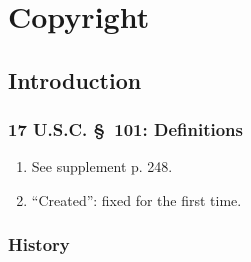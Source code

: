 \section{Copyright}

\subsection{Introduction}

\subsubsection{17 U.S.C. \S\ 101: Definitions}

\begin{enumerate}
    \item See supplement p. 248.
    \item ``Created'': fixed for the first time.
\end{enumerate}

\subsubsection{History}

